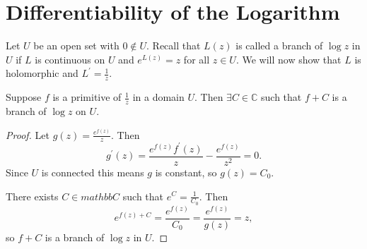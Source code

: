 \section{Differentiability of the Logarithm}

Let $U$ be an open set with $0 \notin U$.
Recall that $L(z)$ is called a branch of $\log z$ in $U$ if $L$
is continuous on $U$ and $e^{L(z)} = z$ for all $z \in U$. We will now
show that $L$ is holomorphic and $L^\prime = \frac{1}{z}$.

\begin{theorem}
Suppose $f$ is a primitive of $\frac{1}{z}$ in a domain $U$. Then
$\exists C \in \mathbb{C}$ such that $f + C$ is a branch of $\log z$ on $U$.
\end{theorem}

\begin{proof}
Let $g(z) = \frac{e^{f(z)}}{z}$. Then
$$
  g^\prime(z)
= \frac{e^{f(z)}f^\prime(z)}{z} - \frac{e^{f(z)}}{z^2}
= 0.
$$
Since $U$ is connected this means $g$ is constant, so
$g(z) = C_0$.

There exists $C \in mathbb{C}$ such that $e^C = \frac{1}{C_0}$. Then
$$
e^{f(z) + C} = \frac{e^{f(z)}}{C_0} = \frac{e^{f(z)}}{g(z)} = z,
$$
so $f + C$ is a branch of $\log z$ in $U$.
\end{proof}
